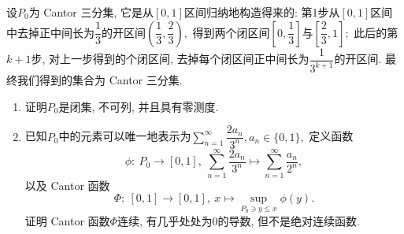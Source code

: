 \begin{question}[points = 10]
  设$P_0$为 Cantor 三分集, 它是从$[0, 1]$区间归纳地构造得来的: 第1步从$[0, 1]$区间中去掉正中间长为$\dfrac{1}{3}$的开区间$\left( \dfrac{1}{3}, \dfrac{2}{3} \right),$ 得到两个闭区间$\left[ 0, \dfrac{1}{3} \right]$与$\left[ \dfrac{2}{3}, 1 \right];$ 此后的第$k + 1$步, 对上一步得到的个闭区间, 去掉每个闭区间正中间长为$\dfrac{1}{3^{k+1}}$的开区间. 最终我们得到的集合为 Cantor 三分集.
  \begin{enumerate}
    \item 证明$P_0$是闭集, 不可列, 并且具有零测度.
    \item 已知$P_0$中的元素可以唯一地表示为$\displaystyle \sum\limits_{n=1}^{\infty} \dfrac{2a_n}{3^n}, a_n \in \{0, 1\},$ 定义函数
    $$
    \phi: ~ P_0 \rightarrow [0, 1], ~ \sum\limits_{n=1}^{\infty} \dfrac{2a_n}{3^n} \mapsto \sum\limits_{n=1}^{\infty} \dfrac{a_n}{2^n},
    $$
    以及 Cantor 函数
    $$
    \Phi: ~ [0, 1] \rightarrow [0, 1], ~ x \mapsto \sup\limits_{P_0 \ni y \leqslant x} \phi(y).
    $$
    证明 Cantor 函数$\Phi$连续, 有几乎处处为0的导数, 但不是绝对连续函数.
  \end{enumerate}

\end{question}

